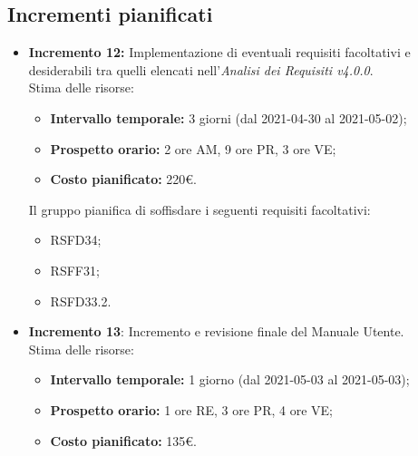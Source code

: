 \subsection{Incrementi pianificati}
\begin{itemize}
	\item \textbf{Incremento 12:}
	Implementazione di eventuali requisiti facoltativi e desiderabili tra quelli elencati nell'\textit{Analisi dei Requisiti v4.0.0}. \\
	Stima delle risorse:
  \begin{itemize}
		\item \textbf{Intervallo temporale:} 3 giorni (dal 2021-04-30 al 2021-05-02);
		\item \textbf{Prospetto orario:} 2 ore AM, 9 ore PR, 3 ore VE;
		\item \textbf{Costo pianificato:} 220€.
	\end{itemize}
	Il gruppo pianifica di soffisdare i seguenti requisiti facoltativi:
		\begin{itemize}
			\item RSFD34;
			\item RSFF31;
			\item RSFD33.2.
		\end{itemize}

	\item \textbf{Incremento 13}:
	Incremento e revisione finale del Manuale Utente.\\
	Stima delle risorse:
  \begin{itemize}
		\item \textbf{Intervallo temporale:} 1 giorno (dal 2021-05-03 al 2021-05-03);
		\item \textbf{Prospetto orario:} 1 ore RE, 3 ore PR, 4 ore VE;
		\item \textbf{Costo pianificato:} 135€.
	\end{itemize}


\end{itemize}
